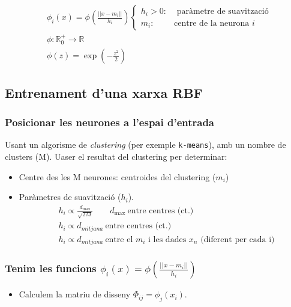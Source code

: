 \begin{align*}
& \phi_i (x) = \phi\left( \frac{||x - m_i||}{h_i} \right)
\begin{cases}
h_i > 0: &\text{ paràmetre de suavització} \\
m_i: &\text{centre de la neurona } i
\end{cases} \\
& \phi:\mathbb{R}_0^+ \rightarrow \mathbb{R} \\
& \phi(z) = \exp\left( - \frac{z^2}{2} \right)
\end{align*}

\begin{figure}[H]
	\centering
\end{figure}
\subsection{Entrenament d'una xarxa RBF}
\subsubsection{Posicionar les neurones a l'espai d'entrada}
Usant un algorisme de \emph{clustering} (per exemple \texttt{k-means}), amb un nombre de clusters (M). Uaser el resultat del clustering per determinar:
\begin{itemize}
	\item Centre des les M neurones: centroides del clustering ($m_i$)
	\item Paràmetres de suavització ($h_i$).
	\begin{align*}
		& h_i \propto \frac{d_{\max}}{\sqrt{2M}} \qquad d_{\max}\ \text{entre centres (ct.)} \\
		& h_i \propto d_{mitjana} \ \text{entre centres (ct.)} \\
		& h_i \propto d_{mitjana} \ \text{entre el $m_i$ i les dades $x_n$ (diferent per cada i)}
	\end{align*}
\end{itemize}

\subsubsection{Tenim les funcions $\phi_i (x) = \phi\left( \frac{||x - m_i||}{h_i} \right)$}
\begin{itemize}
	\item Calculem la matriu de disseny $\Phi_{ij} = \phi_j(x_i)$.
\end{itemize}
